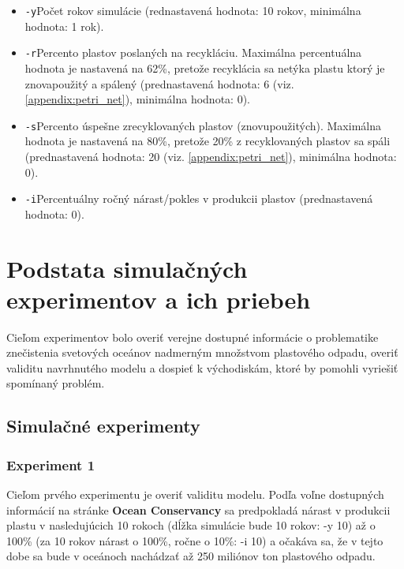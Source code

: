 \documentclass[a4paper, 11pt]{article}
\begin{document}
\begin{itemize}
	\item \texttt{-y}\quad Počet rokov simulácie (rednastavená hodnota: 10 rokov, minimálna hodnota: 1 rok).
	\item \texttt{-r}\quad Percento plastov poslaných na recykláciu. Maximálna percentuálna hodnota je nastavená na 62\%, pretože recyklácia sa netýka plastu ktorý je znovapoužitý a spálený (prednastavená hodnota: 6 (viz. \ref{appendix:petri_net}), minimálna hodnota: 0).
	\item \texttt{-s}\quad Percento úspešne zrecyklovaných plastov (znovupoužitých). Maximálna hodnota je nastavená na 80\%, pretože 20\% z recyklovaných plastov sa spáli (prednastavená hodnota: 20 (viz. \ref{appendix:petri_net}), minimálna hodnota: 0).
	\item \texttt{-i}\quad Percentuálny ročný nárast/pokles v produkcii plastov (prednastavená hodnota: 0).
\end{itemize}

\pagebreak
\section{Podstata simulačných experimentov a ich priebeh}

Cieľom experimentov bolo overiť verejne dostupné informácie o problematike znečistenia svetových oceánov nadmerným množstvom plastového odpadu, overiť validitu navrhnutého modelu a dospieť k východiskám, ktoré by pomohli vyriešiť spomínaný problém.

\subsection{Simulačné experimenty}

\subsubsection{Experiment 1}
\label{label:exp1}

Cieľom prvého experimentu je overiť validitu modelu. Podľa voľne dostupných informácií na stránke \textbf{Ocean Conservancy} \cite{ocean_conservancy} sa predpokladá nárast v produkcii plastu v nasledujúcich 10 rokoch (dĺžka simulácie bude 10 rokov: -y 10) až o 100\% (za 10 rokov nárast o 100\%, ročne o 10\%: -i 10) a očakáva sa, že v tejto dobe sa bude v oceánoch nachádzať až 250 miliónov ton plastového odpadu.
\end{document}
